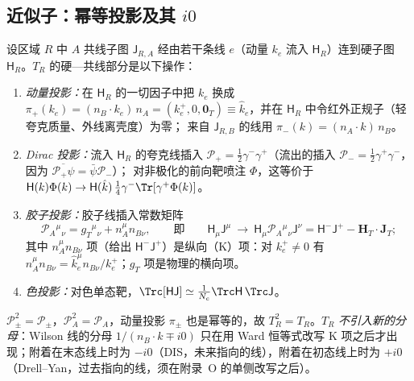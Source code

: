 \subsection{近似子：幂等投影及其 $i0$}

\begin{definition}\label{def:method-collinear-approx}
设区域 $R$ 中 $A$ 共线子图 $\mathsf J_{R,A}$ 经由若干条线 $e$（动量 $k_e$ 流入 $\mathsf H_R$）连到硬子图 $\mathsf H_R$。$T_R$ 的硬—共线部分是以下操作：
\begin{enumerate}[label=(\roman*),leftmargin=2em,itemsep=1pt,topsep=2pt]
\item \emph{动量投影：}在 $\mathsf H_R$ 的一切因子中把 $k_e$ 换成 $\pi_+(k_e)=(n_B\cdot k_e)\,n_A=(k_e^+,0,\mathbf 0_T)\equiv\hat k_e$，并在 $\mathsf H_R$ 中令红外正规子（轻夸克质量、外线离壳度）为零；
  来自 $\mathsf J_{R,B}$ 的线用 $\pi_-(k)=(n_A\cdot k)\,n_B$。
\item \emph{Dirac 投影：}流入 $\mathsf H_R$ 的夸克线插入 $\mathcal P_+=\frac12\gamma^-\gamma^+$（流出的插入 $\mathcal P_-=\frac12\gamma^+\gamma^-$，因为 $\overline{\mathcal P_+\psi}=\bar\psi\mathcal P_-$）；
  对非极化的前向靶喷注 $\Phi$，这等价于 $\mathsf H(k)\Phi(k)\to\mathsf H(\hat k)\,\frac14\gamma^-\Tr[\gamma^+\Phi(k)]$。
\item \emph{胶子投影：}胶子线插入常数矩阵
  \begin{equation}\label{eq:method-PA}
  \mathcal P_A{}^\mu{}_\nu=g_T{}^\mu{}_\nu+n_A^\mu n_{B\nu},\qquad\text{即}\qquad \mathsf H_\mu\mathsf J^\mu\ \to\ \mathsf H_\mu\mathcal P_A{}^\mu{}_\nu\mathsf J^\nu=\mathsf H^-\mathsf J^+-\mathbf H_T\cdot\mathbf J_T ;
  \end{equation}
  其中 $n_A^\mu n_{B\nu}$ 项（给出 $\mathsf H^-\mathsf J^+$）是纵向（K）项：对 $k_e^+\neq0$ 有 $n_A^\mu n_{B\nu}=\hat k_e^\mu n_{B\nu}/k_e^+$；$g_T$ 项是物理的横向项。
\item \emph{色投影：}对色单态靶，$\Trc[\mathsf H\mathsf J]\simeq\frac1{N_c}\Trc\mathsf H\,\Trc\mathsf J$。
\end{enumerate}
$\mathcal P_\pm^2=\mathcal P_\pm$，$\mathcal P_A^2=\mathcal P_A$，动量投影 $\pi_\pm$ 也是幂等的，故 $T_R^2=T_R$。$T_R$ \emph{不引入新的分母}：Wilson 线的分母 $1/(n_B\cdot k\mp i0)$
只在用 Ward 恒等式改写 K 项之后才出现；附着在末态线上时为 $-i0$（DIS，未来指向的线），附着在初态线上时为 $+i0$（Drell--Yan，过去指向的线，须在附录~O 的单侧改写之后）。
\end{definition}

